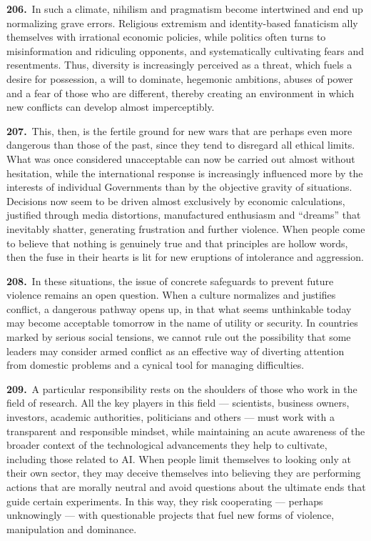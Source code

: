 \documentclass{article}
\begin{document}
\textbf{206.}\ In such a climate, nihilism and pragmatism become intertwined and end up normalizing grave errors. Religious extremism and identity-based fanaticism ally themselves with irrational economic policies, while politics often turns to misinformation and ridiculing opponents, and systematically cultivating fears and resentments. Thus, diversity is increasingly perceived as a threat, which fuels a desire for possession, a will to dominate, hegemonic ambitions, abuses of power and a fear of those who are different, thereby creating an environment in which new conflicts can develop almost imperceptibly.\cite{n186}

\textbf{207.}\ This, then, is the fertile ground for new wars that are perhaps even more dangerous than those of the past, since they tend to disregard all ethical limits. What was once considered unacceptable can now be carried out almost without hesitation, while the international response is increasingly influenced more by the interests of individual Governments than by the objective gravity of situations. Decisions now seem to be driven almost exclusively by economic calculations, justified through media distortions, manufactured enthusiasm and ``dreams'' that inevitably shatter, generating frustration and further violence. When people come to believe that nothing is genuinely true and that principles are hollow words, then the fuse in their hearts is lit for new eruptions of intolerance and aggression.

\textbf{208.}\ In these situations, the issue of concrete safeguards to prevent future violence remains an open question. When a culture normalizes and justifies conflict, a dangerous pathway opens up, in that what seems unthinkable today may become acceptable tomorrow in the name of utility or security. In countries marked by serious social tensions, we cannot rule out the possibility that some leaders may consider armed conflict as an effective way of diverting attention from domestic problems and a cynical tool for managing difficulties.

\textbf{209.}\ A particular responsibility rests on the shoulders of those who work in the field of research. All the key players in this field --- scientists, business owners, investors, academic authorities, politicians and others --- must work with a transparent and responsible mindset, while maintaining an acute awareness of the broader context of the technological advancements they help to cultivate, including those related to AI. When people limit themselves to looking only at their own sector, they may deceive themselves into believing they are performing actions that are morally neutral and avoid questions about the ultimate ends that guide certain experiments. In this way, they risk cooperating --- perhaps unknowingly --- with questionable projects that fuel new forms of violence, manipulation and dominance.
\end{document}
